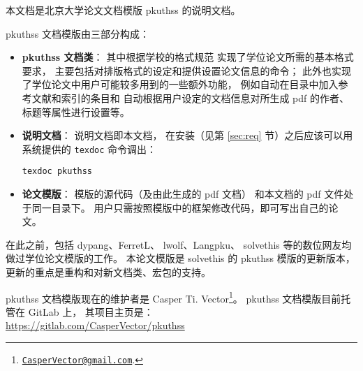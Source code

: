 %
%
%
%
%


本文档是北京大学论文文档模版 pkuthss 的说明文档。

pkuthss 文档模版由三部分构成：
\begin{itemize}
	\item \textbf{pkuthss 文档类}：
		其中根据学校的格式规范\mbox{\supercite{pku-thesisstyle}}%
		实现了学位论文所需的基本格式要求，
		主要包括对排版格式的设定和提供设置论文信息的命令；
		此外也实现了学位论文中用户可能较多用到的一些额外功能，
		例如自动在目录中加入参考文献和索引的条目和
		自动根据用户设定的文档信息对所生成 pdf 的作者、标题等属性进行设置等。
	\item \textbf{说明文档}：
		说明文档即本文档，
		在安装（见第 \ref{sec:req} 节）之后应该可以用  系统提供的
		\verb|texdoc| 命令调出：
\begin{Verbatim}[frame = single]
texdoc pkuthss
\end{Verbatim}
	\item \textbf{论文模版}：
		模版的源代码（及由此生成的 pdf 文档）
		和本文档的 pdf 文件处于同一目录下。
		用户只需按照模版中的框架修改代码，即可写出自己的论文。
\end{itemize}

在此之前，包括 dypang\supercite{dypang}、FerretL\supercite{FerretL}、%
lwolf\supercite{lwolf}、Langpku\supercite{Langpku}、%
solvethis\supercite{solvethis} 等的数位网友均做过学位论文模版的工作。
本论文模版是 solvethis 的 pkuthss 模版的更新版本，
更新的重点是重构和对新文档类、宏包的支持。

pkuthss 文档模版现在的维护者是 Casper Ti. Vector\footnote%
{\href{mailto:CasperVector@gmail.com}{\texttt{CasperVector@gmail.com}}.}。%
pkuthss 文档模版目前托管在 GitLab 上，
其项目主页是：\\
\hspace*{\parindent}\url{https://gitlab.com/CasperVector/pkuthss}

